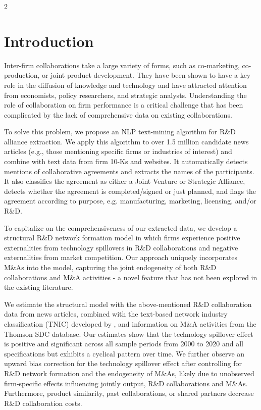 \documentclass[12pt]{article}
\begin{document}
\doublespacing

\thispagestyle{empty}

\newpage
\setcounter{page}{1}


\renewcommand{\baselinestretch}{2} 
\begin{spacing}{2}

\section{Introduction}
\label{sec:introduction}
Inter-firm collaborations take a large variety of forms, such as co-marketing, co-production, or joint product development. They have been shown to have a key role in the diffusion of knowledge and technology and have attracted attention from economists, policy researchers, and strategic analysts. Understanding the role of collaboration on firm performance is a critical challenge that has been complicated by the lack of comprehensive data on existing collaborations.

To solve this problem, we propose an NLP text-mining algorithm for R\&D alliance extraction. We apply this algorithm to over 1.5 million candidate news articles (e.g., those mentioning specific firms or industries of interest) and combine with text data from firm 10-Ks and websites. It automatically detects mentions of collaborative agreements and extracts the names of the participants. It also classifies the agreement as either a Joint Venture or Strategic Alliance, detects whether the agreement is completed/signed or just planned, and flags the agreement according to purpose, e.g. manufacturing, marketing, licensing, and/or R\&D. 

To capitalize on the comprehensiveness of our extracted data, we develop a structural R\&D network formation model in which firms experience positive externalities from technology spillovers in R\&D collaborations and negative externalities from market competition. Our approach uniquely incorporates M\&As into the model, capturing the joint endogeneity of both R\&D collaborations and M\&A activities - a novel feature that has not been explored in the existing literature.

We estimate the structural model with the above-mentioned R\&D collaboration data from news articles, combined with the text-based network industry classification (TNIC) developed by \citet{hoberg2016}, and information on M\&A activities from the Thomson SDC database. Our estimates show that the technology spillover effect is positive and significant across all sample periods from 2000 to 2020 and all specifications but exhibits a cyclical pattern over time. We further observe an upward bias correction for the technology spillover effect after controlling for R\&D network formation and the endogeneity of M\&As, likely due to unobserved firm-specific effects influencing jointly output, R\&D collaborations and M\&As. Furthermore, product similarity, past collaborations, or shared partners decrease R\&D collaboration costs. 


\end{spacing}
\end{document}
